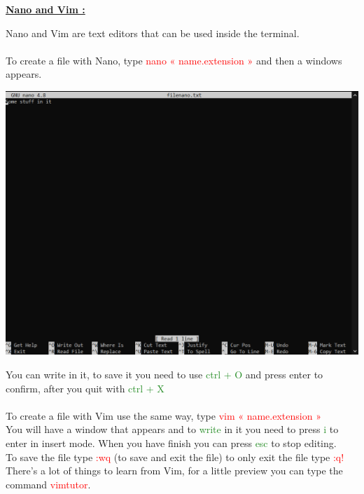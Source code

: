 \documentclass{article}
\begin{document}
\newpage
\begin{center}
    \LARGE{\bf \underline {Nano and Vim :}} \\
\end{center}
Nano and Vim are text editors that can be used inside the terminal. \\ \\
To create a file with Nano, type \textcolor{red}{nano « name.extension »} and then a windows appears. \\
\begin{center}
    \includegraphics[scale=0.45]{Nano.png}
\end{center}
You can write in it, to save it you need to use \textcolor{ForestGreen}{ctrl + O} and press enter to confirm, after you quit with \textcolor{ForestGreen}{ctrl + X} \\ \\
To create a file with Vim use the same way, type \textcolor{red}{vim « name.extension »} \\
You will have a window that appears and to \textcolor{ForestGreen}{write} in it you need to press \textcolor{ForestGreen}{i} to enter in insert mode. When you have finish you can press \textcolor{ForestGreen}{esc} to stop editing. \\
To save the file type \textcolor{red}{:wq} (to save and exit the file) to only exit the file type \textcolor{red}{:q!} \\
There's a lot of things to learn from Vim, for a little preview you can type the command \textcolor{red}{vimtutor}. \\
\end{document}
